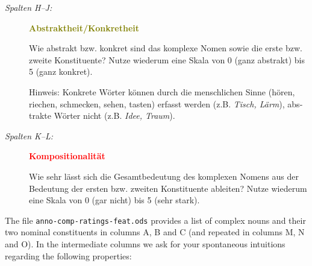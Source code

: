 \documentclass[output=paper,colorlinks,citecolor=brown]{langscibook}
\begin{document}
\begin{otherlanguage}{ngerman}
\begin{description}
\item[\textit{Spalten H--J:}] \textcolor{olive}{\textbf{Abstraktheit/Konkretheit}}

  Wie abstrakt bzw. konkret sind das komplexe Nomen sowie die erste
  bzw. zweite Konstituente? Nutze wiederum eine Skala von 0 (ganz
  abstrakt) bis 5 (ganz konkret).

  Hinweis: Konkrete Wörter können durch die menschlichen Sinne (hören,
  riechen, schmecken, sehen, tasten) erfasst werden
  (z.B. \textit{Tisch, Lärm}), abstrakte Wörter nicht
  (z.B. \textit{Idee, Traum}).

\item[\textit{Spalten K--L:}] \textcolor{red}{\textbf{Kompositionalität}}

  Wie sehr lässt sich die Gesamtbedeutung des komplexen Nomens aus der
  Bedeutung der ersten bzw. zweiten Konstituente ableiten? Nutze
  wiederum eine Skala von 0 (gar nicht) bis 5 (sehr stark).

\end{description}
\end{otherlanguage}



The file \texttt{anno-comp-ratings-feat.ods} provides a list of complex nouns and their two nominal constituents in columns A, B and C (and repeated in columns M, N and O). In the intermediate columns we ask for your spontaneous intuitions regarding the following properties:
\end{document}
